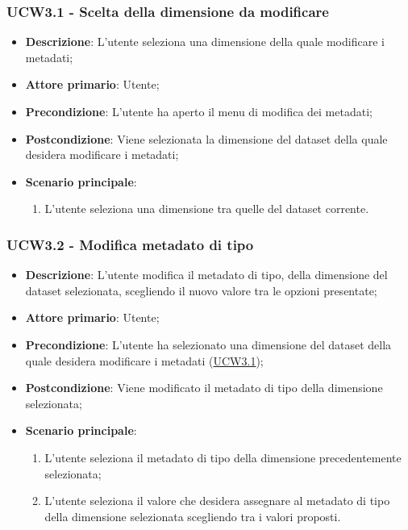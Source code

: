\newpage

\subsubsection{UCW3.1 - Scelta della dimensione da modificare}
\label{ssub:ucw3.1}

\begin{itemize}
    \item \textbf{Descrizione}: L’utente seleziona una dimensione della quale modificare i metadati;
    \item \textbf{Attore primario}: Utente;

    \item \textbf{Precondizione}:   L'utente ha aperto il menu di modifica dei metadati;
    \item \textbf{Postcondizione}:  Viene selezionata la dimensione del dataset della quale desidera modificare i 
    metadati;

    \item \textbf{Scenario principale}:
    \begin{enumerate}
        \item L'utente seleziona una dimensione tra quelle del dataset corrente.
    \end{enumerate}
\end{itemize}

\subsubsection{UCW3.2 - Modifica metadato di tipo}
\label{ssub:ucw3.2}

\begin{itemize}
    \item \textbf{Descrizione}: L’utente modifica il metadato di tipo, della dimensione del dataset selezionata, 
    scegliendo il nuovo valore tra le opzioni presentate;
	
    \item \textbf{Attore primario}: Utente;
    
    \item \textbf{Precondizione}:   L'utente ha selezionato una dimensione del dataset della quale desidera modificare 
    i metadati (\hyperref[ssub:ucw3.1]{UCW3.1});
    \item \textbf{Postcondizione}:  Viene modificato il metadato di tipo della dimensione selezionata;

	\item \textbf{Scenario principale}:
	\begin{enumerate}
        \item L'utente seleziona il metadato di tipo della dimensione precedentemente selezionata;
        \item L'utente seleziona il valore che desidera assegnare al metadato di tipo della dimensione selezionata 
        scegliendo tra i valori proposti.
    \end{enumerate}
    
   
\end{itemize}


